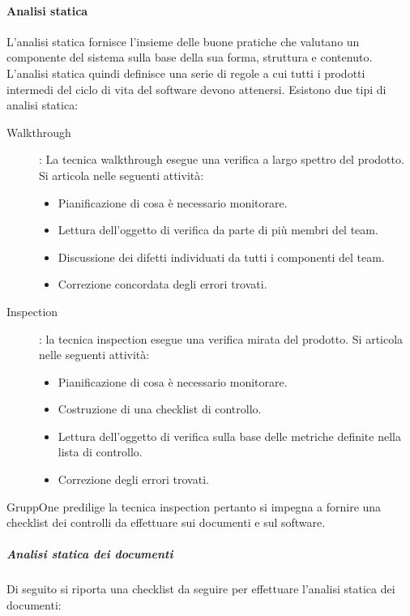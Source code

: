 \documentclass[../norme-di-progetto.tex]{subfiles}
\begin{document}
\paragraph{Analisi statica}%
\label{par:analisi_statica}
L'analisi statica fornisce l'insieme delle buone pratiche che valutano un componente del sistema sulla base della sua forma, struttura e contenuto. L'analisi statica quindi definisce una serie di regole  a cui tutti i prodotti intermedi del ciclo di vita del software devono attenersi. Esistono due tipi di analisi statica:
\begin{description}
  \item [Walkthrough]: La tecnica walkthrough esegue una verifica a largo spettro del prodotto. Si articola nelle seguenti attività:
        \begin{itemize}
          \item Pianificazione di cosa è necessario monitorare.
          \item Lettura dell'oggetto di verifica da parte di più membri del team.
          \item Discussione dei difetti individuati da tutti i componenti del team.
          \item Correzione concordata degli errori trovati.
        \end{itemize}
  \item [Inspection]: la tecnica inspection esegue una verifica mirata del prodotto. Si articola nelle seguenti attività:
        \begin{itemize}
          \item Pianificazione di cosa è necessario monitorare.
          \item Costruzione di una checklist di controllo.
          \item Lettura dell'oggetto di verifica sulla base delle metriche definite nella lista di controllo.
          \item Correzione degli errori trovati.
        \end{itemize}
\end{description}
GruppOne predilige la tecnica inspection pertanto si impegna a fornire una checklist dei controlli da effettuare sui documenti e sul software.

\subparagraph{Analisi statica dei documenti}%
\label{subp:analisi_statica_dei_documenti}
Di seguito si riporta una checklist da seguire per effettuare l'analisi statica dei documenti:
\end{document}
